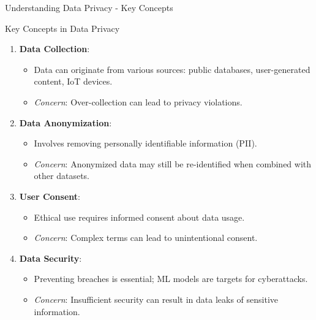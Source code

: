 \documentclass[aspectratio=169]{beamer}
\begin{document}
\begin{frame}[fragile]{Understanding Data Privacy - Key Concepts}
    \begin{block}{Key Concepts in Data Privacy}
        \begin{enumerate}
            \item \textbf{Data Collection}:
            \begin{itemize}
                \item Data can originate from various sources: public databases, user-generated content, IoT devices.
                \item \textit{Concern}: Over-collection can lead to privacy violations.
            \end{itemize}

            \item \textbf{Data Anonymization}:
            \begin{itemize}
                \item Involves removing personally identifiable information (PII).
                \item \textit{Concern}: Anonymized data may still be re-identified when combined with other datasets.
            \end{itemize}

            \item \textbf{User Consent}:
            \begin{itemize}
                \item Ethical use requires informed consent about data usage.
                \item \textit{Concern}: Complex terms can lead to unintentional consent.
            \end{itemize}

            \item \textbf{Data Security}:
            \begin{itemize}
                \item Preventing breaches is essential; ML models are targets for cyberattacks.
                \item \textit{Concern}: Insufficient security can result in data leaks of sensitive information.
            \end{itemize}
        \end{enumerate}
    \end{block}
\end{frame}
\end{document}
